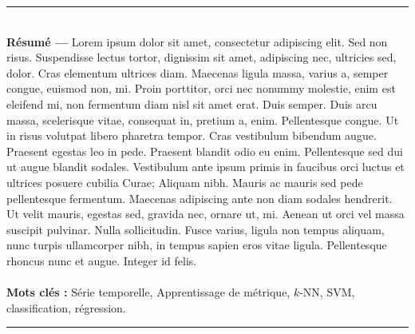 \begin{vcenterpage}
\noindent\rule[2pt]{\textwidth}{0.5pt}
\\
{\large\textbf{Résumé ---}}
    Lorem ipsum dolor sit amet, consectetur adipiscing elit. Sed non risus. Suspendisse lectus tortor, dignissim sit amet, adipiscing nec, ultricies sed, dolor. Cras elementum ultrices diam. Maecenas ligula massa, varius a, semper congue, euismod non, mi. Proin porttitor, orci nec nonummy molestie, enim est eleifend mi, non fermentum diam nisl sit amet erat. Duis semper. Duis arcu massa, scelerisque vitae, consequat in, pretium a, enim. Pellentesque congue. Ut in risus volutpat libero pharetra tempor. Cras vestibulum bibendum augue. Praesent egestas leo in pede. Praesent blandit odio eu enim. Pellentesque sed dui ut augue blandit sodales. Vestibulum ante ipsum primis in faucibus orci luctus et ultrices posuere cubilia Curae; Aliquam nibh. Mauris ac mauris sed pede pellentesque fermentum. Maecenas adipiscing ante non diam sodales hendrerit. Ut velit mauris, egestas sed, gravida nec, ornare ut, mi. Aenean ut orci vel massa suscipit pulvinar. Nulla sollicitudin. Fusce varius, ligula non tempus aliquam, nunc turpis ullamcorper nibh, in tempus sapien eros vitae ligula. Pellentesque rhoncus nunc et augue. Integer id felis.
\\
\\
{\large\textbf{Mots clés :}}
    Série temporelle, Apprentissage de métrique, $k$-NN, SVM, classification, régression.
\\
\noindent\rule[2pt]{\textwidth}{0.5pt}


\end{vcenterpage}
